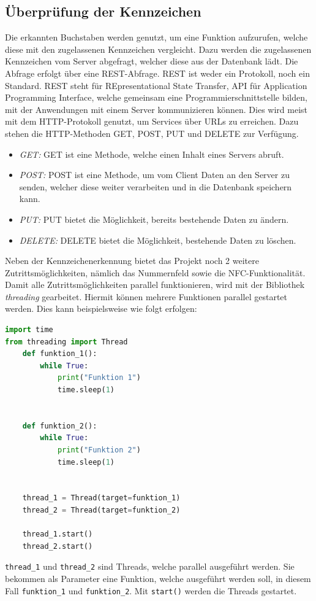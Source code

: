 \subsection{Überprüfung der Kennzeichen}
Die erkannten Buchstaben werden genutzt, um eine Funktion aufzurufen, welche diese mit den zugelassenen Kennzeichen vergleicht. Dazu werden die zugelassenen Kennzeichen vom Server abgefragt, welcher diese aus der Datenbank lädt. Die Abfrage erfolgt über eine REST-Abfrage.
REST ist weder ein Protokoll, noch ein Standard. REST steht für REpresentational State Transfer, API für Application Programming Interface, welche gemeinsam eine Programmierschnittstelle bilden, mit der Anwendungen mit einem Server kommunizieren können. Dies wird meist mit dem HTTP-Protokoll genutzt, um Services über URLs zu erreichen. Dazu stehen die HTTP-Methoden GET, POST, PUT und DELETE zur Verfügung.
\begin{itemize}
    \item \textit{GET: } GET ist eine Methode, welche einen Inhalt eines Servers abruft.
    \item \textit{POST: } POST ist eine Methode, um vom Client Daten an den Server zu senden, welcher diese weiter verarbeiten und in die Datenbank speichern kann.
    \item \textit{PUT: } PUT bietet die Möglichkeit, bereits bestehende Daten zu ändern.
    \item \textit{DELETE: } DELETE bietet die Möglichkeit, bestehende Daten zu löschen.
\end{itemize}\cite{WhatIsREST}
Neben der Kennzeichenerkennung bietet das Projekt noch 2 weitere Zutrittsmöglichkeiten, nämlich das Nummernfeld sowie die NFC-Funktionalität. Damit alle Zutrittsmöglichkeiten parallel funktionieren, wird mit der Bibliothek \textit{threading} gearbeitet. Hiermit können mehrere Funktionen parallel gestartet werden. Dies kann beispielsweise wie folgt erfolgen:
\begin{lstlisting}[language=Python, caption=Funktionsweise von Multiprocessing, label=lst:lsg:multiprocessing]
import time
from threading import Thread
    def funktion_1():
        while True:
            print("Funktion 1")
            time.sleep(1)
    
    
    def funktion_2():
        while True:
            print("Funktion 2")
            time.sleep(1)
    
    
    thread_1 = Thread(target=funktion_1)
    thread_2 = Thread(target=funktion_2)
    
    thread_1.start()
    thread_2.start()
\end{lstlisting}
\verb|thread_1| und \verb|thread_2| sind Threads, welche parallel ausgeführt werden. Sie bekommen als Parameter eine Funktion, welche ausgeführt werden soll, in diesem Fall \verb|funktion_1| und \verb|funktion_2|. Mit \verb|start()| werden die Threads gestartet.
    \cite{threading}
